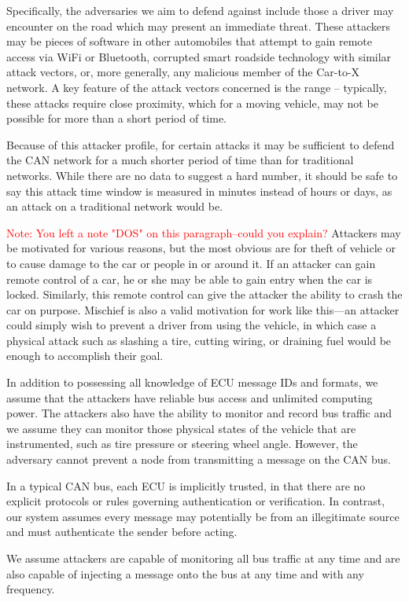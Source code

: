 Specifically, the adversaries we aim to defend against include those a driver may encounter on the road which may present an immediate threat. These attackers may be pieces of software in other automobiles that attempt to gain remote access via WiFi or Bluetooth, corrupted smart roadside technology with similar attack vectors, or, more generally, any malicious member of the Car-to-X network. A key feature of the attack vectors concerned is the range -- typically, these attacks require close proximity, which for a moving vehicle, may not be possible for more than a short period of time. 

Because of this attacker profile, for certain attacks it may be sufficient to defend the CAN network for a much shorter period of time than for traditional networks. While there are no data to suggest a hard number, it should be safe to say this attack time window is measured in minutes instead of hours or days, as an attack on a traditional network would be. 



\textcolor{red}{Note: You left a note "DOS" on this paragraph--could you explain?}
Attackers may be motivated for various reasons, but the most obvious are for theft of vehicle or to cause damage to the car or people in or around it. If an attacker can gain remote control of a car, he or she may be able to gain entry when the car is locked. Similarly, this remote control can give the attacker the ability to crash the car on purpose. Mischief is also a valid motivation for work like this---an attacker could simply wish to prevent a driver from using the vehicle, in which case a physical attack such as slashing a tire, cutting wiring, or draining fuel would be enough to accomplish their goal.

In addition to possessing all knowledge of ECU message IDs and formats, we assume that the attackers have reliable bus access and unlimited computing power. The attackers also have the ability to monitor and record bus traffic and we assume they can monitor those physical states of the vehicle that are instrumented, such as tire pressure or steering wheel angle. However, the adversary cannot prevent a node from transmitting a message on the CAN bus.


In a typical CAN bus, each ECU is implicitly trusted, in that there are no explicit protocols or rules governing authentication or verification. In contrast, our system assumes every message may potentially be from an illegitimate source and must authenticate the sender before acting. 

We assume attackers are capable of monitoring all bus traffic at any time and are also capable of injecting a message onto the bus at any time and with any frequency.
